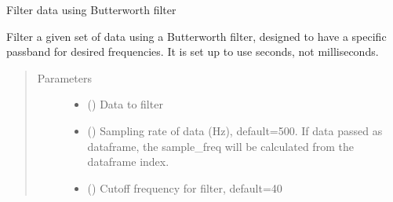 \documentclass[letterpaper,10pt,english]{sphinxmanual}
\begin{document}
\begin{fulllineitems}
\label{\detokenize{_autosummary/tools.maths.filter_butterworth:tools.maths.filter_butterworth}}
\sphinxAtStartPar
Filter data using Butterworth filter

\sphinxAtStartPar
Filter a given set of data using a Butterworth filter, designed to have a specific passband for desired
frequencies. It is set up to use seconds, not milliseconds.
\begin{quote}\begin{description}
\item[{Parameters}] \leavevmode\begin{itemize}
\item {} 
\sphinxAtStartPar
{} () \textendash{} Data to filter

\item {} 
\sphinxAtStartPar
{} () \textendash{} Sampling rate of data (Hz), default=500. If data passed as dataframe, the sample\_freq will be calculated from
the dataframe index.

\item {} 
\sphinxAtStartPar
{} () \textendash{} Cut\sphinxhyphen{}off frequency for filter, default=40


\end{itemize}
\end{description}
\end{quote}
\end{fulllineitems}
\end{document}
